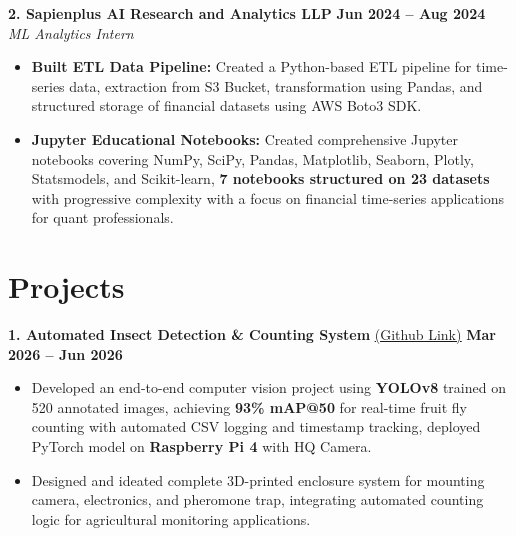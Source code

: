 \documentclass[9pt]{article}
\begin{document}
\noindent \textbf{2. Sapienplus AI Research and Analytics LLP} \hfill \textbf{Jun 2024 -- Aug 2024} \\
\textit{ML Analytics Intern}
{\small

\begin{itemize}[leftmargin=*, nosep, topsep=1.5pt, itemsep=0.5pt]

    \item \textbf{Built ETL Data Pipeline:} Created a Python-based ETL pipeline for time-series data, extraction from S3 Bucket, transformation using Pandas, and structured storage of financial datasets using AWS Boto3 SDK.
    
    \item \textbf{Jupyter Educational Notebooks:} Created comprehensive Jupyter notebooks covering NumPy, SciPy, Pandas, Matplotlib, Seaborn, Plotly, Statsmodels, and Scikit-learn, \textbf{7 notebooks structured on 23 datasets} with progressive complexity with a focus on financial time-series applications for quant professionals.
    
\end{itemize}
}
\vspace{2pt}



\section*{Projects}

{\noindent \bf 1. Automated Insect Detection \& Counting System}     \href{https://github.com/keshavsays08/Automated-Insect-Detection-Counting-System-Fruit-Fly-Insect}{{\color{blue} \underline{(Github Link)}}}
\hfill \textbf{Mar 2026 -- Jun 2026}
{\small
\begin{itemize}[leftmargin=*, nosep, topsep=1.5pt, itemsep=0.5pt]
    \item Developed an end-to-end computer vision project using \textbf{YOLOv8} trained on 520 annotated images, achieving \textbf{93\% mAP@50} for real-time fruit fly counting with automated CSV logging and timestamp tracking, deployed PyTorch model on \textbf{Raspberry Pi 4} with HQ Camera.
    \item Designed and ideated complete 3D-printed enclosure system for mounting camera, electronics, and pheromone trap, integrating automated counting logic for agricultural monitoring applications.
\end{itemize}
}
\vspace{2pt}
\end{document}
